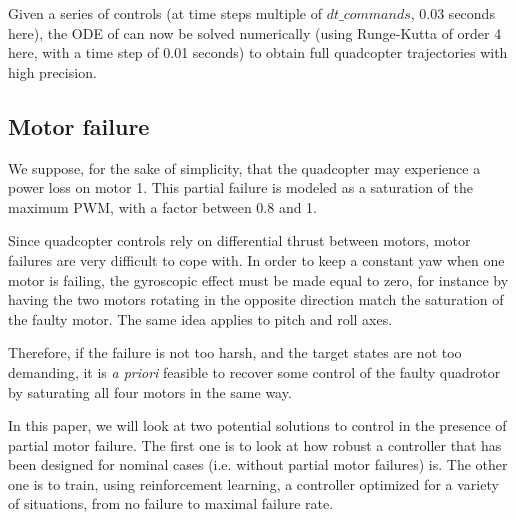 \documentclass[anonymous=true,format=sigconf, screen=true, review=false]{acmart}
\begin{document}
 Given a series of controls (at time steps multiple of $dt\_commands$, 0.03 seconds here), the ODE of  %
can now be solved numerically (using Runge-Kutta of order 4 here, with a time step of 0.01 seconds) to obtain full quadcopter trajectories with high precision.



\subsection{Motor failure}

\label{sec:motorfailure}

We suppose, for the sake of simplicity, that the quadcopter may experience a power loss on motor 1. 
This partial failure is modeled as a saturation of the maximum PWM, with a factor between 0.8 and 1.


 
Since quadcopter controls rely on differential thrust between motors, motor failures are very difficult to cope with. In order to keep a constant yaw when one motor is failing, the gyroscopic effect must be made equal to zero, for instance by having the two motors rotating in the opposite direction match the saturation of the faulty motor. The same idea applies to pitch and roll axes. 

Therefore, if the failure is not too harsh, and the target states are not too demanding, it is {\it a priori} feasible to recover some control of the faulty quadrotor by saturating all four motors in the same way. 

In this paper, we will look at two potential solutions to control in the presence of partial motor failure. The first one is to look at how robust a controller that has been designed for nominal cases (i.e. without partial motor failures) is. The other one is to train, using reinforcement learning, a controller optimized for a variety of situations, from no failure to maximal failure rate. 
\end{document}
